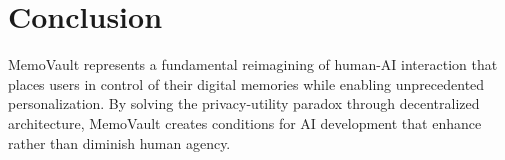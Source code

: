 \documentclass[12pt, a4paper]{article}
\begin{document}




\newpage
\section{Conclusion}

MemoVault represents a fundamental reimagining of human-AI interaction that places users in control of their digital memories while enabling unprecedented personalization. By solving the privacy-utility paradox through decentralized architecture, MemoVault creates conditions for AI development that enhance rather than diminish human agency.


\end{document}
